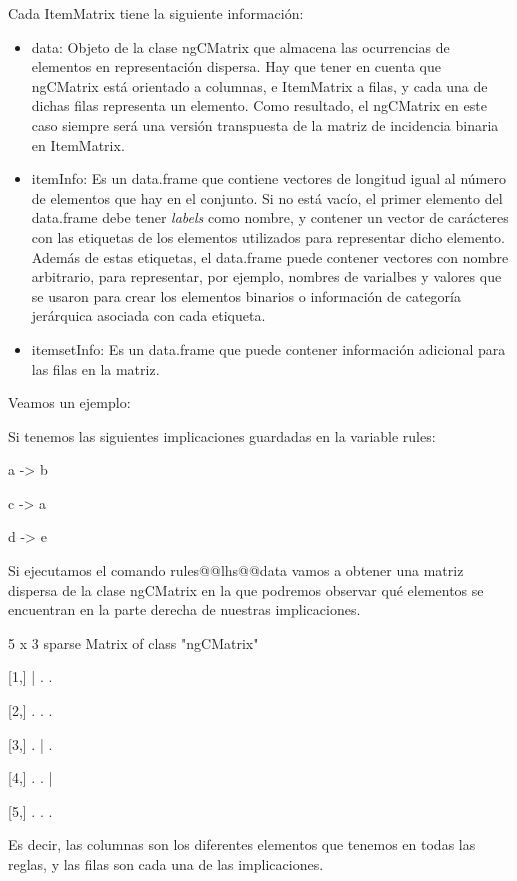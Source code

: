 Cada ItemMatrix tiene la siguiente informaci\'on:
\begin{itemize}

    \item data:
    Objeto de la clase ngCMatrix que almacena las ocurrencias de elementos en 
    representaci\'on dispersa. Hay que tener en cuenta que ngCMatrix est\'a orientado 
    a columnas, e ItemMatrix a filas, y cada una de dichas filas representa un elemento.
    Como resultado, el ngCMatrix en este caso siempre ser\'a una versi\'on transpuesta 
    de la matriz de incidencia binaria en ItemMatrix.


    \item itemInfo:
    Es un data.frame que contiene vectores de longitud igual al n\'umero de elementos que 
    hay en el conjunto. Si no est\'a vac\'io, el primer elemento del data.frame debe tener 
    \textit{labels} como nombre, y contener un vector de car\'acteres con las etiquetas de los 
    elementos utilizados para representar dicho elemento. Adem\'as de estas etiquetas, el 
    data.frame puede contener vectores con nombre arbitrario, para representar, por ejemplo, 
    nombres de varialbes y valores que se usaron para crear los elementos binarios o 
    informaci\'on de categor\'ia jer\'arquica asociada con cada etiqueta.


    \item itemsetInfo:
    Es un data.frame que puede contener informaci\'on adicional para las filas en la matriz.

\end{itemize}


Veamos un ejemplo:

Si tenemos las siguientes implicaciones guardadas en la variable rules:

a -> b

c -> a

d -> e

Si ejecutamos el comando rules@@lhs@@data vamos a obtener una matriz dispersa de la clase 
ngCMatrix en la que podremos observar qu\'e elementos se encuentran en la parte derecha de 
nuestras implicaciones.

5 x 3 sparse Matrix of class "ngCMatrix"
          
[1,] | . .

[2,] . . .

[3,] . | .

[4,] . . |

[5,] . . .

Es decir, las columnas son los diferentes elementos que tenemos en todas las reglas, y las 
filas son cada una de las implicaciones.

